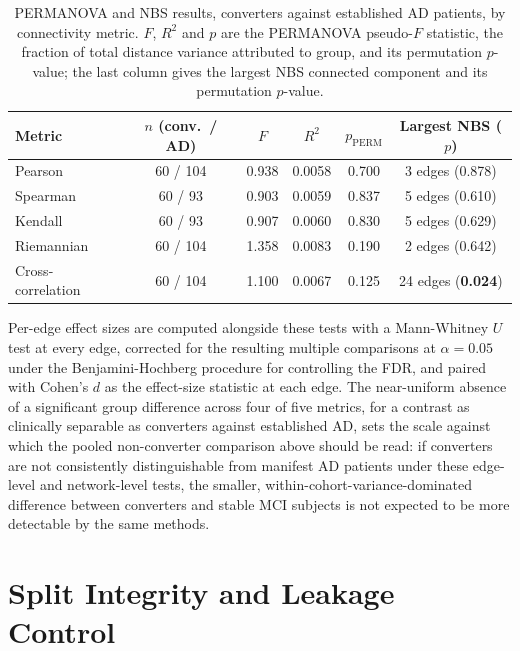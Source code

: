 \begin{table}[htbp]
  \centering
  \small
  \setlength{\tabcolsep}{5.5pt}
  \caption{\ac{PERMANOVA} and \ac{NBS} results, converters against established \ac{AD}
  patients, by connectivity metric. $F$, $R^2$ and $p$ are the \ac{PERMANOVA} pseudo-$F$
  statistic, the fraction of total distance variance attributed to group, and its
  permutation $p$-value; the last column gives the largest \ac{NBS} connected component
  and its permutation $p$-value.}
  \label{tab:permanova-nbs}
  \begin{tabular}{@{}lccccc@{}}
    \toprule
    Metric & $n$ (conv.\ / \ac{AD}) & $F$ & $R^2$ & $p_{\text{PERM}}$ & Largest \ac{NBS} ($p$) \\
    \midrule
    Pearson & 60 / 104 & 0.938 & 0.0058 & 0.700 & 3 edges (0.878) \\
    Spearman & 60 / 93 & 0.903 & 0.0059 & 0.837 & 5 edges (0.610) \\
    Kendall & 60 / 93 & 0.907 & 0.0060 & 0.830 & 5 edges (0.629) \\
    Riemannian & 60 / 104 & 1.358 & 0.0083 & 0.190 & 2 edges (0.642) \\
    Cross-correlation & 60 / 104 & 1.100 & 0.0067 & 0.125 & 24 edges (\textbf{0.024}) \\
    \bottomrule
  \end{tabular}
\end{table}

Per-edge effect sizes are computed alongside these tests with a Mann-Whitney $U$ test at
every edge, corrected for the resulting multiple comparisons at $\alpha = 0.05$ under the
Benjamini-Hochberg procedure for controlling the \ac{FDR}, and paired with Cohen's $d$ as
the effect-size statistic at each edge. The near-uniform absence of a significant group
difference across four of five metrics, for a contrast as clinically separable as converters
against established \ac{AD}, sets the scale against which the pooled non-converter
comparison above should be read: if converters are not consistently distinguishable from
manifest \ac{AD} patients under these edge-level and network-level tests, the smaller,
within-cohort-variance-dominated difference between converters and stable \ac{MCI} subjects
is not expected to be more detectable by the same methods.

\section{Split Integrity and Leakage Control}\label{sec:leakage}

